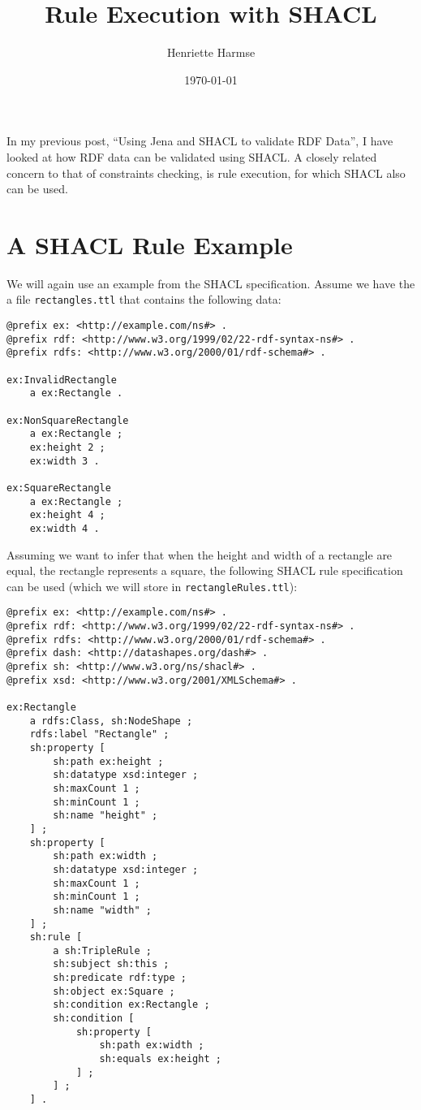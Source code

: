 \documentclass{amsart}
\title{Rule Execution with SHACL}
\author{Henriette Harmse}
\date{\today}
\begin{document}
  \maketitle
  
  In my previous post, ``Using Jena and SHACL to validate RDF Data'', I have looked at how RDF data can be validated using SHACL. A closely related  concern to that of constraints checking, is rule execution, for which SHACL also can be used.

  
  \section{A SHACL Rule Example}
  We will again use an example from the SHACL specification. Assume we have the a file \texttt{rectangles.ttl} that contains the following data:
  
  \begin{small}
  \begin{Verbatim}
@prefix ex: <http://example.com/ns#> .
@prefix rdf: <http://www.w3.org/1999/02/22-rdf-syntax-ns#> .
@prefix rdfs: <http://www.w3.org/2000/01/rdf-schema#> .

ex:InvalidRectangle
	a ex:Rectangle .

ex:NonSquareRectangle
	a ex:Rectangle ;
	ex:height 2 ;
	ex:width 3 .
	
ex:SquareRectangle
	a ex:Rectangle ;
	ex:height 4 ;
	ex:width 4 . 
  \end{Verbatim}
  \end{small}
  
\vspace{5mm}

  Assuming we want to infer that when the height and width of a rectangle are equal, the rectangle represents a square, the following SHACL rule specification can be used (which we will store in \texttt{rectangleRules.ttl}):
  \begin{small}
  \begin{Verbatim}  
@prefix ex: <http://example.com/ns#> .
@prefix rdf: <http://www.w3.org/1999/02/22-rdf-syntax-ns#> .
@prefix rdfs: <http://www.w3.org/2000/01/rdf-schema#> .
@prefix dash: <http://datashapes.org/dash#> .
@prefix sh: <http://www.w3.org/ns/shacl#> .
@prefix xsd: <http://www.w3.org/2001/XMLSchema#> .

ex:Rectangle
	a rdfs:Class, sh:NodeShape ;
	rdfs:label "Rectangle" ;
	sh:property [
		sh:path ex:height ;
		sh:datatype xsd:integer ;
		sh:maxCount 1 ;
		sh:minCount 1 ;
		sh:name "height" ;
	] ;
	sh:property [
		sh:path ex:width ;
		sh:datatype xsd:integer ;
		sh:maxCount 1 ;
		sh:minCount 1 ;
		sh:name "width" ;
	] ;
	sh:rule [
		a sh:TripleRule ;
		sh:subject sh:this ;
		sh:predicate rdf:type ;
		sh:object ex:Square ;
		sh:condition ex:Rectangle ;
		sh:condition [
			sh:property [
				sh:path ex:width ;
				sh:equals ex:height ;
			] ;
		] ;
	] .
  \end{Verbatim}
  \end{small}
  
\end{document}
